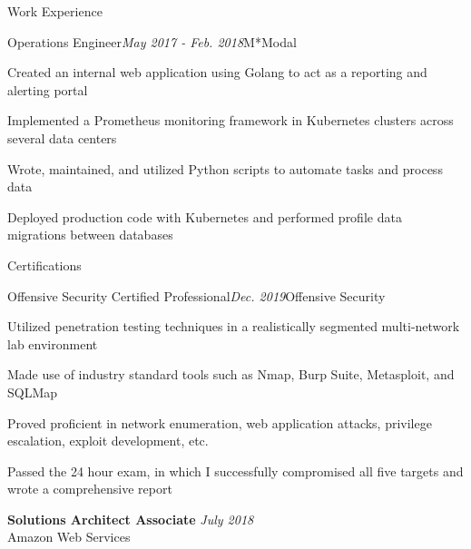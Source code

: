 \documentclass{resume} %
\begin{document}
\begin{rSection}{\vspace{-5pt}Work Experience}

\begin{rSubsection}{Operations Engineer}{\em May 2017 - Feb. 2018}{M*Modal}{}
\item {Created an internal web application using Golang to act as a reporting and alerting portal}
\item {Implemented a Prometheus monitoring framework in Kubernetes clusters across several data centers}
\item {Wrote, maintained, and utilized Python scripts to automate tasks and process data}
\item {Deployed production code with Kubernetes and performed profile data migrations between databases}
\end{rSubsection}

\end{rSection}

\begin{rSection}{\vspace{-5pt}Certifications}
  \begin{rSubsection}{Offensive Security Certified Professional}{\em Dec. 2019}{Offensive Security}{}
  \item {Utilized penetration testing techniques in a realistically segmented multi-network lab environment}
  \item {Made use of industry standard tools such as Nmap, Burp Suite, Metasploit, and SQLMap }
  \item {Proved proficient in network enumeration, web application attacks, privilege escalation, exploit development, etc.}
  \item {Passed the 24 hour exam, in which I successfully compromised all five targets and wrote a comprehensive report}
  \end{rSubsection}
  {\bf Solutions Architect Associate} \hfill {\em July 2018} 
  \\ Amazon Web Services
\end{rSection}
\end{document}
